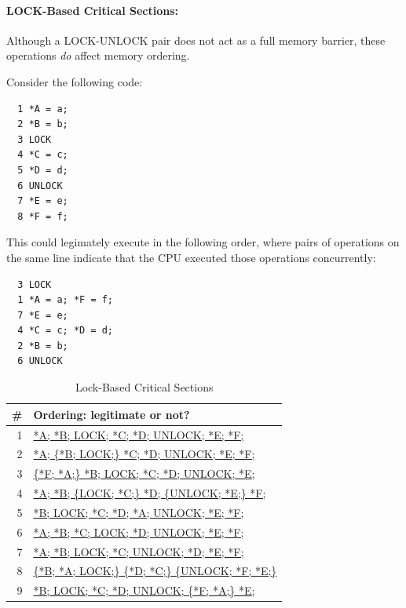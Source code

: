 \paragraph{LOCK-Based Critical Sections:}
Although a LOCK-UNLOCK pair does not act as a full memory barrier,
these operations \emph{do} affect memory ordering.

Consider the following code:

\vspace{5pt}
\begin{minipage}[t]{\columnwidth}
\small
\begin{verbatim}
  1 *A = a;
  2 *B = b;
  3 LOCK
  4 *C = c;
  5 *D = d;
  6 UNLOCK
  7 *E = e;
  8 *F = f;
\end{verbatim}
\end{minipage}
\vspace{5pt}

This could legimately execute in the following order, where pairs
of operations on the same line indicate that the CPU executed those
operations concurrently:

\vspace{5pt}
\begin{minipage}[t]{\columnwidth}
\small
\begin{verbatim}
  3 LOCK
  1 *A = a; *F = f;
  7 *E = e;
  4 *C = c; *D = d;
  2 *B = b;
  6 UNLOCK
\end{verbatim}
\end{minipage}
\vspace{5pt}

\begin{table}[htbp]
\begin{tabular}{r|l}
  \# & Ordering: legitimate or not? \\
  \hline
  \hline
  1 & \url{*A; *B; LOCK; *C; *D; UNLOCK; *E; *F;} \\
  \hline
  2 & \url{*A; {*B; LOCK;} *C; *D; UNLOCK; *E; *F;} \\
  \hline
  3 & \url{{*F; *A;} *B; LOCK; *C; *D; UNLOCK; *E;} \\
  \hline
  4 & \url{*A; *B; {LOCK; *C;} *D; {UNLOCK; *E;} *F;} \\
  \hline
  5 & \url{*B; LOCK; *C; *D; *A; UNLOCK; *E; *F;} \\
  \hline
  6 & \url{*A; *B; *C; LOCK; *D; UNLOCK; *E; *F;} \\
  \hline
  7 & \url{*A; *B; LOCK; *C; UNLOCK; *D; *E; *F;} \\
  \hline
  8 & \url{{*B; *A; LOCK;} {*D; *C;} {UNLOCK; *F; *E;}} \\
  \hline
  9 & \url{*B; LOCK; *C; *D; UNLOCK; {*F; *A;} *E; } \\
\end{tabular}
\caption{Lock-Based Critical Sections}
\label{tab:advsync:Lock-Based Critical Sections}
\end{table}


